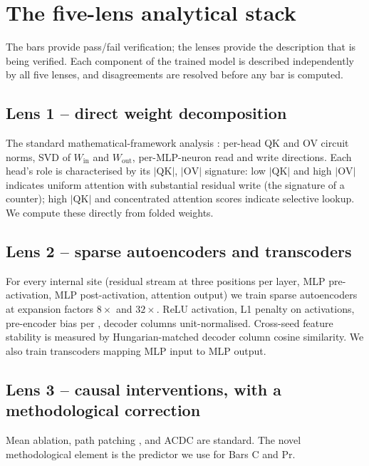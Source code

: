 \documentclass[11pt,letterpaper]{article}
\begin{document}
\section{The five-lens analytical stack}
\label{sec:lenses}

The bars provide pass/fail verification; the lenses provide the description that is being verified. Each component of the trained model is described independently by all five lenses, and disagreements are resolved before any bar is computed.

\subsection{Lens 1 -- direct weight decomposition}

The standard mathematical-framework analysis \citep{elhage2021mathematical}: per-head QK and OV circuit norms, SVD of $W_{\mathrm{in}}$ and $W_{\mathrm{out}}$, per-MLP-neuron read and write directions. Each head's role is characterised by its $|\mathrm{QK}|$, $|\mathrm{OV}|$ signature: low $|\mathrm{QK}|$ and high $|\mathrm{OV}|$ indicates uniform attention with substantial residual write (the signature of a counter); high $|\mathrm{QK}|$ and concentrated attention scores indicate selective lookup. We compute these directly from folded weights.

\subsection{Lens 2 -- sparse autoencoders and transcoders}

For every internal site (residual stream at three positions per layer, MLP pre-activation, MLP post-activation, attention output) we train sparse autoencoders at expansion factors $8\times$ and $32\times$. ReLU activation, L1 penalty on activations, pre-encoder bias per \citet{bricken2023monosemanticity}, decoder columns unit-normalised. Cross-seed feature stability is measured by Hungarian-matched decoder column cosine similarity. We also train transcoders \citep{dunefsky2024transcoders} mapping MLP input to MLP output.

\subsection{Lens 3 -- causal interventions, with a methodological correction}
\label{sec:lens3}

Mean ablation, path patching \citep{goldowskydill2023localizing}, and ACDC \citep{conmy2023acdc} are standard. The novel methodological element is the predictor we use for Bars C and Pr.
\end{document}
